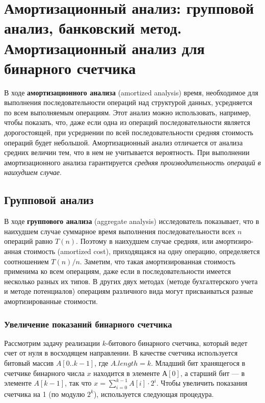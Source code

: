 \section{Амортизационный анализ: групповой анализ, банковский метод. Амортизационный анализ для бинарного счетчика }

В ходе \textbf{амортизационного анализа} (amortized analysis) время, необходимое для выполнения последовательности операций над структурой данных, усредняется по всем выполняемым операциям.
Этот анализ можно использовать, например, чтобы показать, что, даже если одна из операций последовательности является дорогостоящей, при усреднении по всей последовательности средняя стоимость операций будет небольшой.
Амортизационный анализ отличается от анализа средних величин тем, что в нем не учитывается вероятность.
При выполнении амортизационного анализа гарантируется \textit{средняя производительность операций в наихудшем случае}.

\subsection{Групповой анализ}

В ходе \textbf{группового анализа} (aggregate analysis) исследователь показывает, что в наихудшем случае суммарное время выполнения последовательности всех $n$ операций равно $T(n)$.
Поэтому в наихудшем случае средняя, или амортизиро-анная стоимость (amortized cost), приходящаяся на одну операцию, определяется соотношением $T(n)/n$.
Заметим, что такая амортизированная стоимость применима ко всем операциям, даже если в последовательности имеется несколько разных их типов.
В других двух методах (методе бухгалтерского учета и методе потенциалов) операциям различного вида могут присваиваться разные амортизированные стоимости.

\subsubsection{Увеличение показаний бинарного счетчика}

Рассмотрим задачу реализации $k$-битового бинарного счетчика, который ведет счет от нуля в восходящем направлении.
В качестве счетчика используется битовый массив $A[0..k - 1]$, где $A.length = k$.
Младший бит хранящегося в счетчике бинарного числа $x$ находится в элементе $А[0]$, а старший бит --- в элементе $A[k - 1]$, так что $x = \sum_{i = 0}^{k - 1}A[i] \cdot 2^i$.
Чтобы увеличить показания счетчика на 1 (по модулю $2^k$), используется следующая процедура.

